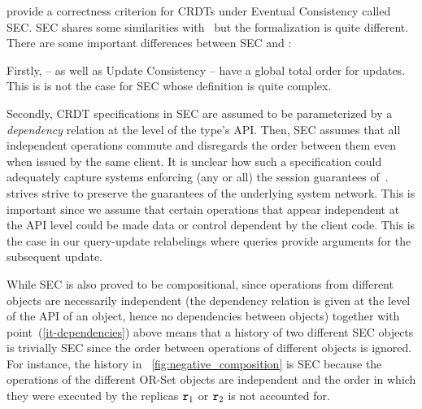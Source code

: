 
\citet{JagadeesanR18} provide a correctness criterion for CRDTs under
Eventual Consistency called SEC.
%
SEC shares some similarities with~\cite{PerrinMJ14} but the
formalization is quite different.
There are some important differences between SEC and \CRDTLinshort{}:
\begin{inparaenum}
\item Firstly, \CRDTLinshort{} -- as well as Update Consistency --
  have a global total order for updates. This is is not the case for
  SEC whose definition is quite complex.
\item
  \label{it-dependencies} Secondly, CRDT specifications in SEC are
  assumed to be parameterized by a \emph{dependency} relation at the
  level of the type's API.
  Then, SEC assumes that all independent operations commute and
  disregards the order between them even when issued by the same client.
  It is unclear how such a specification could adequately capture
  systems enforcing (any or all) the session guarantees
  of~\cite{TerryDPSTW94}.
  \CRDTLinshort{} strives strive to preserve the guarantees of the
  underlying system network.
  This is important since we assume that certain
  operations that appear independent at the API level could be
  made data or control dependent by the client code.
  This is the case in our query-update relabelings where queries
  provide arguments for the subsequent update.
\item While SEC is also proved to be compositional, since operations
  from different objects are necessarily independent (the dependency
  relation is given at the level of the API of an object, hence no
  dependencies between objects) together with
  point~(\ref{it-dependencies}) above means that a history of two
  different SEC objects is trivially SEC since the order between
  operations of different objects is ignored.
  For instance, the
  history in \figureautorefname~\ref{fig:negative_composition} is SEC because
  the operations of the different OR-Set objects are independent and the
  order in which they were executed by the replicas $\mathtt{r}_1$ or $\mathtt{r}_2$
  is not accounted for.

\end{inparaenum}
